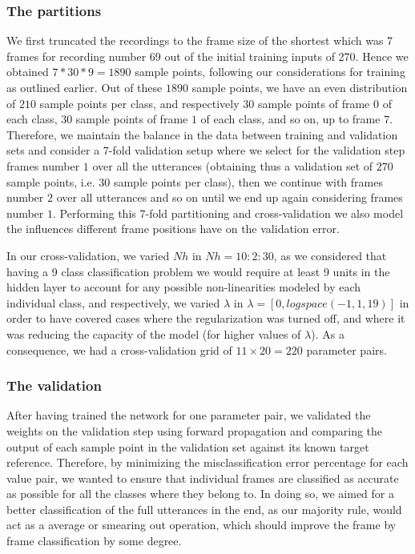 \documentclass[a4paper,10pt]{article}
\begin{document}
\subsubsection{The partitions}
We first truncated the recordings to the frame size of the shortest which was 7 frames for recording number 69 out of the initial training inputs of 270. Hence we obtained $7*30*9 = 1890$ sample points, following our considerations for training as outlined earlier. Out of these $1890$ sample points, we have an even distribution of $210$ sample points per class, and respectively $30$ sample points of frame $0$ of each class, $30$ sample points of frame $1$ of each class, and so on, up to frame $7$. Therefore, we maintain the balance in the data between training and validation sets and consider a $7$-fold validation setup where we select for the validation step frames number $1$ over all the utterances (obtaining thus a validation set of $270$ sample points, i.e. $30$ sample points per class), then we continue with frames number $2$ over all utterances and so on until we end up again considering frames number $1$. Performing this $7$-fold partitioning and cross-validation we also model the influences different frame positions have on the validation error. 

In our cross-validation, we varied $Nh$ in $Nh = 10:2:30$, as we considered that having a 9 class classification problem we would require at least 9 units in the hidden layer to account for any possible non-linearities modeled by each individual class, and respectively, we varied $\lambda$ in $\lambda = [0,logspace(-1,1,19)]$ in order to have covered cases where the regularization was turned off, and where it was reducing the capacity of the model (for higher values of $\lambda$). As a consequence, we had a cross-validation grid of $11 \times 20 = 220$ parameter pairs.  

\subsubsection{The validation}
After having trained the network for one parameter pair, we validated the weights on the validation step using forward propagation and comparing the output of each sample point in the validation set against its known target reference. Therefore, by minimizing the misclassification error percentage for each value pair, we wanted to ensure that individual frames are classified as accurate as possible for all the classes where they belong to. In doing so, we aimed for a better classification of the full utterances in the end, as our majority rule, would act as a average or smearing out operation, which should improve the frame by frame classification by some degree. 
\end{document}
